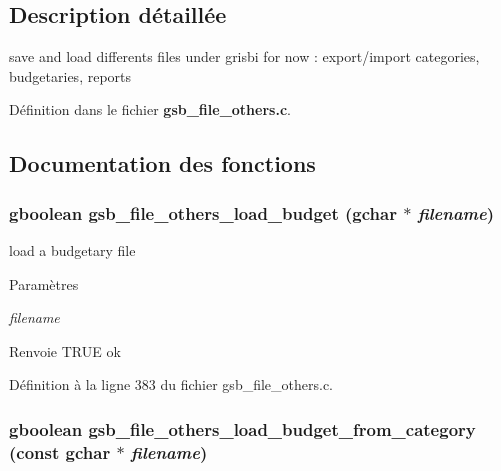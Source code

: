 \subsection{Description détaillée}
save and load differents files under grisbi for now : export/import categories, budgetaries, reports 

Définition dans le fichier {\bf gsb\_\-file\_\-others.c}.



\subsection{Documentation des fonctions}
\subsubsection[{gsb\_\-file\_\-others\_\-load\_\-budget}]{\setlength{\rightskip}{0pt plus 5cm}gboolean gsb\_\-file\_\-others\_\-load\_\-budget (gchar $\ast$ {\em filename})}\label{gsb__file__others_8c_ab94262275e2508a95eff55c1f2fa9274}
load a budgetary file


\begin{DoxyParams}{Paramètres}
\item[{\em filename}]\end{DoxyParams}
\begin{DoxyReturn}{Renvoie}
TRUE ok 
\end{DoxyReturn}


Définition à la ligne 383 du fichier gsb\_\-file\_\-others.c.

\subsubsection[{gsb\_\-file\_\-others\_\-load\_\-budget\_\-from\_\-category}]{\setlength{\rightskip}{0pt plus 5cm}gboolean gsb\_\-file\_\-others\_\-load\_\-budget\_\-from\_\-category (const gchar $\ast$ {\em filename})}\label{gsb__file__others_8c_a8abf9e286be97d09b1c8b6d9197ee74f}


